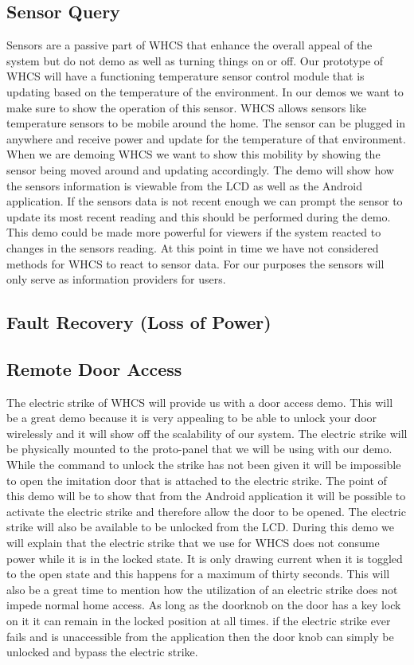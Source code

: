 \subsection{Sensor Query}
Sensors are a passive part of WHCS that enhance the overall appeal of the
system but do not demo as well as turning things on or off. Our prototype of
WHCS will have a functioning temperature sensor control module that is updating
based on the temperature of the environment. In our demos we want to make sure
to show the operation of this sensor.  WHCS allows sensors like temperature
sensors to be mobile around the home. The sensor can be plugged in anywhere and
receive power and update for the temperature of that environment. When we are
demoing WHCS we want to show this mobility by showing the sensor being moved
around and updating accordingly. The demo will show how the sensors information
is viewable from the LCD as well as the Android application. If the sensors
data is not recent enough we can prompt the sensor to update its most recent
reading and this should be performed during the demo. This demo could be made
more powerful for viewers if the system reacted to changes in the sensors
reading. At this point in time we have not considered methods for WHCS to react
to sensor data. For our purposes the sensors will only serve as information
providers for users.

\subsection{Fault Recovery (Loss of Power)}

\subsection{Remote Door Access}
\label{sec:demo-door}
The electric strike of WHCS will provide us with a door access demo. This will
be a great demo because it is very appealing to be able to unlock your door
wirelessly and it will show off the scalability of our system. The electric
strike will be physically mounted to the proto{}-panel that we will be using
with our demo. While the command to unlock the strike has not been given it
will be impossible to open the imitation door that is attached to the electric
strike.  The point of this demo will be to show that from the Android
application it will be possible to activate the electric strike and therefore
allow the door to be opened. The electric strike will also be available to be
unlocked from the LCD. During this demo we will explain that the electric
strike that we use for WHCS does not consume power while it is in the locked
state. It is only drawing current when it is toggled to the open state and this
happens for a maximum of thirty seconds. This will also be a great time to
mention how the utilization of an electric strike does not impede normal home
access. As long as the doorknob on the door has a key lock on it it can remain
in the locked position at all times. if the electric strike ever fails and is
unaccessible from the application then the door knob can simply be unlocked and
bypass the electric strike.
